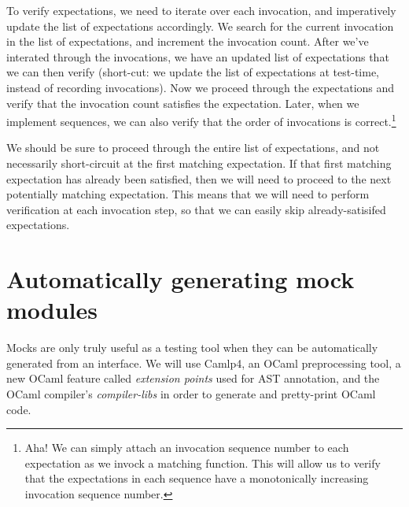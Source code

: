 To verify expectations, we need to iterate over each invocation, and
imperatively update the list of expectations accordingly. We search
for the current invocation in the list of expectations, and increment
the invocation count. After we've interated through the invocations,
we have an updated list of expectations that we can then verify
(short-cut: we update the list of expectations at test-time, instead
of recording invocations). Now we proceed through the expectations and
verify that the invocation count satisfies the expectation. Later,
when we implement sequences, we can also verify that the order of
invocations is correct.\footnote{Aha! We can simply attach an
  invocation sequence number to each expectation as we invock a
  matching function. This will allow us to verify that the
  expectations in each sequence have a monotonically increasing
  invocation sequence number.}

We should be sure to proceed through the entire list of expectations,
and not necessarily short-circuit at the first matching
expectation. If that first matching expectation has already been
satisfied, then we will need to proceed to the next potentially
matching expectation. This means that we will need to perform
verification at each invocation step, so that we can easily skip
already-satisifed expectations.

\section{Automatically generating mock modules}
\label{application:generation}

Mocks are only truly useful as a testing tool when they can be
automatically generated from an interface. We will use Camlp4, an
OCaml preprocessing tool, a new OCaml feature called \textit{extension
  points} used for AST annotation, and the OCaml compiler's
\textit{compiler-libs} in order to generate and pretty-print OCaml
code.
